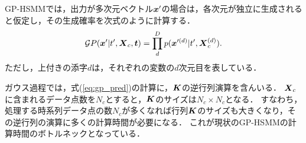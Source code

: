 \documentclass[conference]{IEEEtran}
\begin{document}
GP-HSMMでは，出力が多次元ベクトル${ \boldsymbol x}'$の場合は，各次元が独立に生成されると仮定し，その生成確率を次式のように計算する．
%
\begin{equation}
\label{equ:multi_dim}
{\mathcal GP(\bx'|t', \bX_{c}, \bt)} = \prod_d^D p(\bx'^{(d)}|t', \bX^{(d)}_{c}).
\end{equation}
%
ただし，上付きの添字$d$は，それぞれの変数の$d$次元目を表している．

ガウス過程では，式(\ref{eq:gp_pred})の計算に，${ \boldsymbol K}$の逆行列演算を含んいる．
${ \boldsymbol X}_c$に含まれるデータ点数を$N_c$とすると，${ \boldsymbol K}$のサイズは$N_c \times N_c$となる．
すなわち，処理する時系列データ点の数$N_c$が多くなれば行列${ \boldsymbol K}$のサイズも大きくなり，その逆行列の演算に多くの計算時間が必要になる．
これが現状のGP-HSMMの計算時間のボトルネックとなっている．

\end{document}
